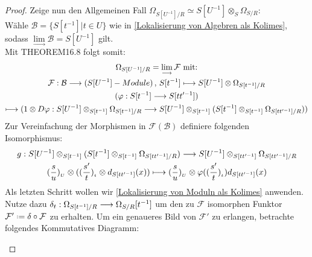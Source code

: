 \documentclass[10pt,a4paper]{report}
\newcommand{\comment}[1]{}
\newcommand{\functionfront}[3]{\nolinebreak{#1:#2 \longrightarrow #3}}
\newcommand{\function}[5]{\nolinebreak{#1:#2 \longrightarrow #3 \, , \, #4 \longmapsto #5}}
\newcommand{\divR}[2]{\Omega_{#1/#2}}
\newcommand{\divf}[1]{d_{#1}}
\newcommand{\Tensor}[3]{#1 \otimes_{#2} #3}
\newcommand{\tensor}[3]{#1 \otimes #3}
\newcommand{\lok}[2]{#1 [#2^{-1}]}
\newcommand{\loke}[3]{(\frac{#1}{#2})_{_{#3}}}
\newcommand{\colimes}[0]{\lim\limits_{ \longrightarrow }}
\newcommand*{\defeq}{\mathrel{\vcenter{\baselineskip0.5ex \lineskiplimit0pt
                     \hbox{\scriptsize.}\hbox{\scriptsize.}}}%
                     =}
\begin{document}
\begin{proof}
Zeige nun den Allgemeinen Fall $\divR{\lok{S}{U}}{R} \simeq \Tensor{\lok{S}{U}}{S}{\divR{S}{R}}$:\\
Wähle $\mathcal{B} = \lbrace \lok{S}{t} \vert t \in U \rbrace$ wie in \cref{Lokalisierung von Algebren als Kolimes}, sodass $\colimes \mathcal{B} = \lok{S}{U}$ gilt.\\
Mit THEOREM16.8 \comment{\label{THEOREM16.8}} folgt somit:
\begin{gather*}
\divR{\lok{S}{U}}{R}  = \colimes{\mathcal{F}} \text{ mit:}\\
\function{\mathcal{F}}{\mathcal{B}}{(\lok{S}{U} - Module)}{\lok{S}{t}}{\tensor{\lok{S}{U}}{\lok{S}{t}}{\divR{\lok{S}{t}}{R}}}\\
( \functionfront{\varphi}{\lok{S}{t}}{\lok{S}{tt'}} )\\ \longmapsto 
( \functionfront{\tensor{1}{\lok{S}{t}}{D\varphi}}{ \Tensor{\lok{S}{U}}{\lok{S}{t}}{\divR{\lok{S}{t}}{R}}}{ \Tensor{\lok{S}{U}}{\lok{S}{t}}{( \Tensor{\lok{S}{t}}{\lok{S}{t}}{\divR{\lok{S}{tt'}}{R}})}} )
\end{gather*}
Zur Vereinfachung der Morphismen in $\mathcal{F}(\mathcal{B})$ definiere folgenden Isomorphismus:
\begin{gather*}
\functionfront{g}{ \Tensor{\lok{S}{U}}{\lok{S}{t}}{( \Tensor{\lok{S}{t}}{\lok{S}{t}}{\divR{\lok{S}{tt'}}{R}})}}{\Tensor{\lok{S}{U}}{\lok{S}{tt'}}{\divR{\lok{S}{tt'}}{R}}}\\
\tensor{\loke{s}{u}{U}}{\lok{S}{t}}{( \tensor{\loke{s'}{t}{t}}{\lok{S}{t}}{\divf{\lok{S}{tt'}}(x)} )} 
\longmapsto \tensor{\loke{s}{u}{U}}{\lok{S}{tt'}}{\varphi(\loke{s'}{t}{t})\divf{\lok{S}{tt'}}(x)}
\end{gather*}
Als letzten Schritt wollen wir \cref{Lokalisierung von Moduln als Kolimes} anwenden. Nutze dazu $\functionfront{\delta_t}{\divR{\lok{S}{t}}{R}}{\lok{\divR{S}{R}}{t}}$ um den zu $\mathcal{F}$ isomorphen Funktor $\mathcal{F'} \defeq \delta \circ \mathcal{F}$ zu erhalten. Um ein genaueres Bild von $\mathcal{F'}$ zu erlangen, betrachte folgendes Kommutatives Diagramm:
\begin{center}
\end{center}
\end{proof}
\end{document}
